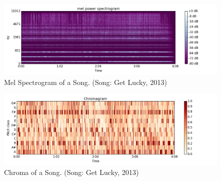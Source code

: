 \documentclass[letterpaper, 10 pt, conference]{ieeeconf}
\begin{document}
\begin{figure}[thpb]
      \centering
      \includegraphics[scale=0.25]{mel_getlucky_3000_mels.png}
      \caption{Mel Spectrogram of a Song. (Song: Get Lucky, 2013)}
      \label{fig:mel}
\end{figure}

\begin{figure}[thpb]
      \centering
      \includegraphics[scale=0.25]{chroma_get_lucky.png}
      \caption{Chroma of a Song. (Song: Get Lucky, 2013)}
      \label{fig:choma}
\end{figure}
\end{document}
